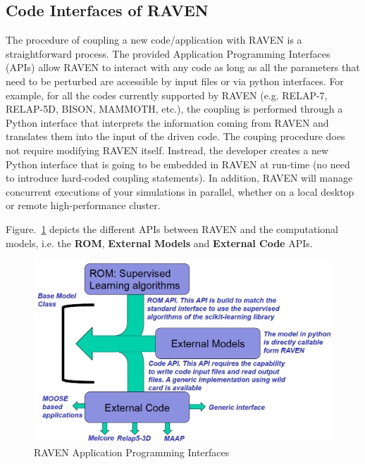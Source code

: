 

\subsection{Code Interfaces of RAVEN}
The procedure of coupling a new code/application with RAVEN is a straightforward process. The provided Application
Programming Interfaces (APIs) allow RAVEN to interact with any code as long as all the parameters that need to be
perturbed are accessible by input files or via python interfaces. For example, for all the codes currently
supported by RAVEN (e.g. RELAP-7, RELAP-5D, BISON, MAMMOTH, etc.), the coupling is performed through a Python interface
that interprets the information coming from RAVEN and translates them into the input of the driven code. The couping procedure
does not require modifying RAVEN itself. Instread, the developer creates a new Python interface that is going to
be embedded in RAVEN at run-time (no need to introduce hard-coded coupling statements). In addition, RAVEN will
manage concurrent executions of your simulations in parallel, whether on a local desktop or remote high-performance cluster.

Figure.~\ref{fig:modelAPIs} depicts the different APIs between RAVEN and the computational models, i.e. the
\textbf{ROM}, \textbf{External Models} and \textbf{External Code} APIs. 

\begin{figure}[h!]
  \includegraphics[width=\textwidth]{pics/modelAPIs.png}
  \caption{RAVEN Application Programming Interfaces}
  \label{fig:modelAPIs}
\end{figure}

